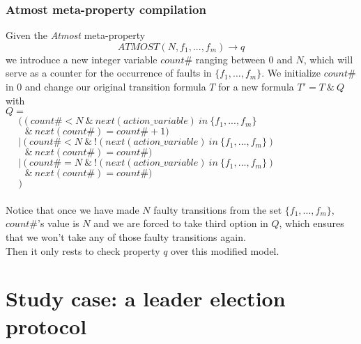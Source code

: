 \documentclass[12pt]{article}
\begin{document}
\subsubsection*{Atmost meta-property compilation}
Given the \textit{Atmost} meta-property $$ATMOST(N,f_1,...,f_m) \rightarrow q$$ we introduce a new integer variable $count\#$ ranging between $0$ and $N$, which will serve as a counter for the occurrence of faults in $\{f_1,...,f_m\}$. We initialize $count\#$ in $0$ and change our original transition formula $T$ for a new formula $T' = T~\&~Q$ with\\
$Q = $\\ 
$~~~~~~(~(~count\# < N~\&~next(action\_variable)~in~\{f_1,...,f_m\}$\\
$~~~~~~~~~\&~next(count\#)=count\#+1)$\\
$~~~~~~|~(~count\# < N~\&~!(next(action\_variable)~in~\{f_1,...,f_m\})$\\
$~~~~~~~~~\&~next(count\#)=count\#)$\\
$~~~~~~|~(~count\# = N~\&~!(next(action\_variable)~in~\{f_1,...,f_m\})$\\
$~~~~~~~~~\&~next(count\#)=count\#)$\\
$~~~~~~)$\\\\
Notice that once we have made $N$ faulty transitions from the set $\{f_1,...,f_m\}$, $count\#$'s value is $N$ and we are forced to take third option in $Q$, which ensures that we won't take any of those faulty transitions again.\\
Then it only rests to check property $q$ over this modified model.

\section{Study case: a leader election protocol}
\end{document}
